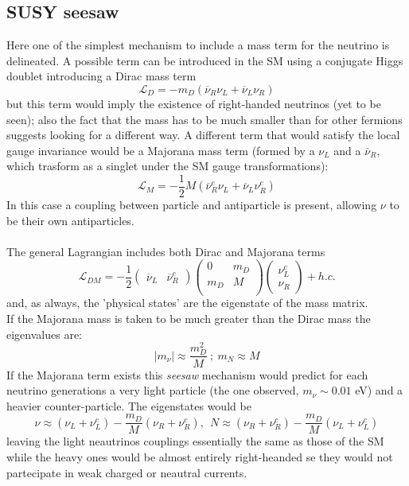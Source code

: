 \documentclass[12pt,a4paper,openright, oneside, titlepage]{book} %
\begin{document}
\subsection{SUSY seesaw}
Here one of the simplest mechanism to include a mass term for the neutrino is delineated. A possible term can be introduced in the SM using a conjugate Higgs doublet introducing a Dirac mass term
$$\mathcal{L}_D=-m_D(\overline{\nu}_R\nu_L+\overline{\nu}_L\nu_R)$$
but this term would imply the existence of right-handed neutrinos (yet to be seen); also the fact that the mass has to be much smaller than for other fermions suggests looking for a different way.
A different term that would satisfy the local gauge invariance would be a Majorana mass term (formed by a $\nu_L$ and a $\bar{\nu}_R$, which trasform as a singlet under the SM gauge transformations):
$$\mathcal{L}_M=-\frac{1}{2} M(\overline{\nu}_R^c\nu_L+\overline{\nu}_L\nu_R^c)$$
In this case a coupling between particle and antiparticle is present, allowing $\nu$ to be their own antiparticles.\\\\
The general Lagrangian includes both Dirac and Majorana terms
$$\mathcal{L}_{DM}= -\frac{1}{2}
\begin{pmatrix} 
\overline{\nu}_L & \overline{\nu}_R^c 
\end{pmatrix}
\begin{pmatrix} 
0 & m_D\\
m_D & M\\
\end{pmatrix}
\begin{pmatrix} 
\nu_L^c\\
\nu_R
\end{pmatrix} + h.c.$$
and, as always, the 'physical states' are the eigenstate of the mass matrix.\\
If the Majorana mass is taken to be much greater than the Dirac mass the eigenvalues are:
$$
|m_\nu|\approx \frac{m_D^2}{M}\ ;\ m_N\approx M
$$
If the Majorana term exists this \textit{seesaw} mechanism would predict for each neutrino generations a very light particle (the one observed, $m_\nu\sim0.01$ eV) and a heavier counter-particle.
The eigenstates would be
$$
\nu\approx (\nu_L+\nu_L^c)-\frac{m_D}{M}(\nu_R+\nu_R^c),\ \
N\approx (\nu_R+\nu_R^c)-\frac{m_D}{M}(\nu_L+\nu_L^c)
$$
leaving the light neautrinos couplings essentially the same as those of the SM while the heavy ones would be almost entirely right-heanded se they would not partecipate in weak charged or neautral currents.
\end{document}
